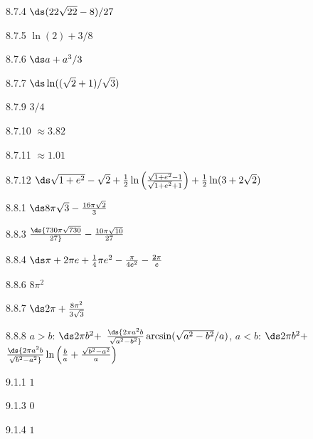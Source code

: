 \begin{Answer}{8.7.4}
 $\ds (22\sqrt{22}-8)/27$
\end{Answer}
\begin{Answer}{8.7.5}
 $\ln(2)+3/8$
\end{Answer}
\begin{Answer}{8.7.6}
 $\ds a+a^3/3$
\end{Answer}
\begin{Answer}{8.7.7}
 $\ds \ln((\sqrt2+1)/\sqrt3)$
\end{Answer}
\begin{Answer}{8.7.9}
 $3/4$
\end{Answer}
\begin{Answer}{8.7.10}
 $\approx 3.82$
\end{Answer}
\begin{Answer}{8.7.11}
 $\approx 1.01$
\end{Answer}
\begin{Answer}{8.7.12}
 $\ds \sqrt{1+e^2}-\sqrt2+
{1\over2}\ln\left({\sqrt{1+e^2}-1\over\sqrt{1+e^2}+1}\right)+
{1\over2}\ln(3+2\sqrt2)$
\end{Answer}
\begin{Answer}{8.8.1}
 $\ds 8\pi\sqrt3-{16\pi\sqrt2\over 3}$
\end{Answer}
\begin{Answer}{8.8.3}
 $\ds {730\pi\sqrt{730}\over27}-{10\pi\sqrt{10}\over 27}$
\end{Answer}
\begin{Answer}{8.8.4}
 $\ds \pi +2\pi e+ {1\over4}\pi e^2-{\pi\over4e^2}-{2\pi\over e}$
\end{Answer}
\begin{Answer}{8.8.6}
 $8\pi^2$
\end{Answer}
\begin{Answer}{8.8.7}
 $\ds 2\pi+{8\pi^2\over 3\sqrt{3}}$
\end{Answer}
\begin{Answer}{8.8.8}
 $a>b$: $\ds 2\pi b^2+$\hfill\break
\hbox{\hskip1cm}$\ds {2\pi a^2b\over\sqrt{a^2-b^2}}
  \arcsin(\sqrt{a^2-b^2}/a)$,\hfill\break
$a<b$: $\ds 2\pi b^2+ $\hfill\break
\hbox{\hskip1cm}$\ds {2\pi a^2b\over\sqrt{b^2-a^2}}
  \ln\left({b\over a}+{\sqrt{b^2-a^2}\over a}\right)$
\end{Answer}
\begin{Answer}{9.1.1}
$1$
\end{Answer}
\begin{Answer}{9.1.3}
$0$
\end{Answer}
\begin{Answer}{9.1.4}
$1$
\end{Answer}
